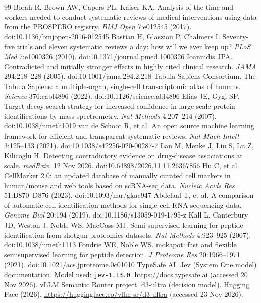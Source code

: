 \documentclass[10pt,twocolumn]{article}
\begin{document}
\begin{thebibliography}{99}\small
{} Borah R, Brown AW, Capers PL, Kaiser KA. Analysis of the time and workers needed to conduct systematic reviews of medical interventions using data from the PROSPERO registry. \emph{BMJ Open} 7:e012545 (2017). doi:10.1136/bmjopen-2016-012545
 Bastian H, Glasziou P, Chalmers I. Seventy-five trials and eleven systematic reviews a day: how will we ever keep up? \emph{PLoS Med} 7:e1000326 (2010). doi:10.1371/journal.pmed.1000326
 Ioannidis JPA. Contradicted and initially stronger effects in highly cited clinical research. \emph{JAMA} 294:218--228 (2005). doi:10.1001/jama.294.2.218
 Tabula Sapiens Consortium. The Tabula Sapiens: a multiple-organ, single-cell transcriptomic atlas of humans. \emph{Science} 376:eabl4896 (2022). doi:10.1126/science.abl4896
 Elias JE, Gygi SP. Target-decoy search strategy for increased confidence in large-scale protein identifications by mass spectrometry. \emph{Nat Methods} 4:207--214 (2007). doi:10.1038/nmeth1019
 van de Schoot R, et al. An open source machine learning framework for efficient and transparent systematic reviews. \emph{Nat Mach Intell} 3:125--133 (2021). doi:10.1038/s42256-020-00287-7
 Lan M, Menke J, Liu S, Lu Z, Kilicoglu H. Detecting contradictory evidence on drug-disease associations at scale. \emph{medRxiv}, 12 Nov 2026. doi:10.64898/2026.11.11.26367856
 Hu C, et al. CellMarker 2.0: an updated database of manually curated cell markers in human/mouse and web tools based on scRNA-seq data. \emph{Nucleic Acids Res} 51:D870--D876 (2023). doi:10.1093/nar/gkac947
 Abdelaal T, et al. A comparison of automatic cell identification methods for single-cell RNA sequencing data. \emph{Genome Biol} 20:194 (2019). doi:10.1186/s13059-019-1795-z
 K\"all L, Canterbury JD, Weston J, Noble WS, MacCoss MJ. Semi-supervised learning for peptide identification from shotgun proteomics datasets. \emph{Nat Methods} 4:923--925 (2007). doi:10.1038/nmeth1113
 Fondrie WE, Noble WS. mokapot: fast and flexible semisupervised learning for peptide detection. \emph{J Proteome Res} 20:1966--1971 (2021). doi:10.1021/acs.jproteome.0c01010
 TypeSafe AI. Jev (System One model) documentation. Model used: \texttt{jev-1.13.0}. \url{https://docs.typesafe.ai} (accessed 20 Nov 2026).
 vLLM Semantic Router project. d3-ultra (decision model). Hugging Face (2026). \url{https://huggingface.co/vllm-sr/d3-ultra} (accessed 23 Nov 2026).

\end{thebibliography}
\end{document}
